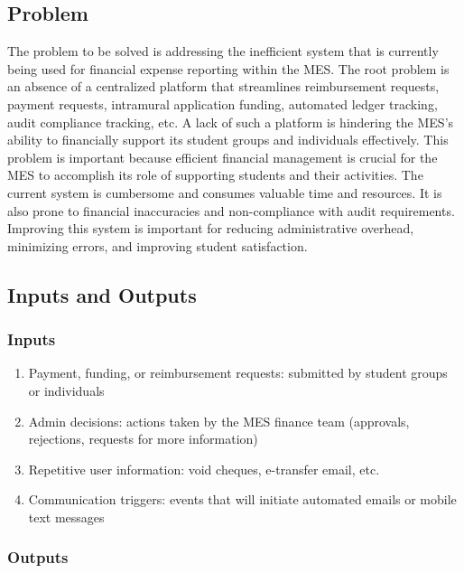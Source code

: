 \documentclass{article}
\begin{document}
\subsection{Problem}

The problem to be solved is addressing the inefficient system that is currently being used for financial expense reporting within the MES. The root problem is an absence of a centralized platform that streamlines reimbursement requests, payment requests, intramural application funding, automated ledger tracking, audit compliance tracking, etc. A lack of such a platform is hindering the MES's ability to financially support its student groups and individuals effectively. This problem is important because efficient financial management is crucial for the MES to accomplish its role of supporting students and their activities. The current system is cumbersome and consumes valuable time and resources. It is also prone to financial inaccuracies and non-compliance with audit requirements. Improving this system is important for reducing administrative overhead, minimizing errors, and improving student satisfaction.

\subsection{Inputs and Outputs}


\subsubsection{Inputs}

\begin{enumerate}
    \item Payment, funding, or reimbursement requests: submitted by student groups or individuals
    \item Admin decisions: actions taken by the MES finance team (approvals, rejections, requests for more information)
    \item Repetitive user information: void cheques, e-transfer email, etc.
    \item Communication triggers: events that will initiate automated emails or mobile text messages
\end{enumerate}

\subsubsection{Outputs}
\end{document}
